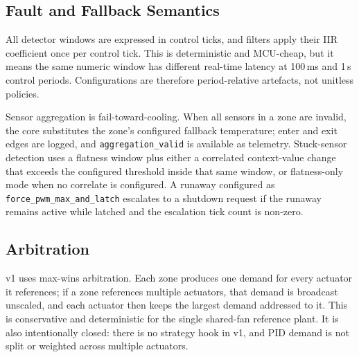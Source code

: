 \subsection{Fault and Fallback Semantics}

All detector windows are expressed in control ticks, and filters apply their IIR coefficient once per control tick. This is deterministic and MCU-cheap, but it means the same numeric window has different real-time latency at 100\,ms and 1\,s control periods. Configurations are therefore period-relative artefacts, not unitless policies.

Sensor aggregation is fail-toward-cooling. When all sensors in a zone are invalid, the core substitutes the zone's configured fallback temperature; enter and exit edges are logged, and \texttt{aggregation\_valid} is available as telemetry. Stuck-sensor detection uses a flatness window plus either a correlated context-value change that exceeds the configured threshold inside that same window, or flatness-only mode when no correlate is configured. A runaway configured as \texttt{force\_pwm\_max\_and\_latch} escalates to a shutdown request if the runaway remains active while latched and the escalation tick count is non-zero.

\subsection{Arbitration}

v1 uses max-wins arbitration. Each zone produces one demand for every actuator it references; if a zone references multiple actuators, that demand is broadcast unscaled, and each actuator then keeps the largest demand addressed to it. This is conservative and deterministic for the single shared-fan reference plant. It is also intentionally closed: there is no strategy hook in v1, and PID demand is not split or weighted across multiple actuators.

\endinput
